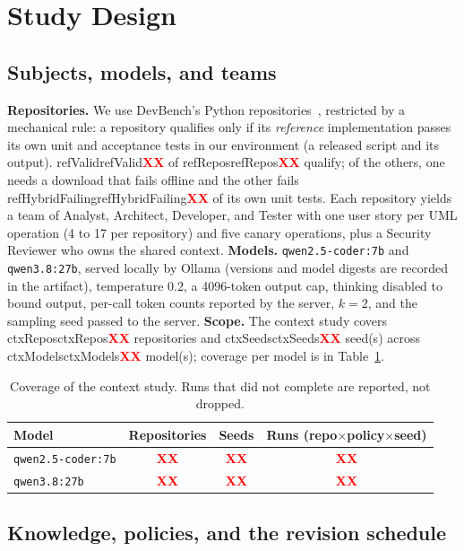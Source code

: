 \documentclass[10pt,conference]{IEEEtran}
\theoremstyle{definition}
\newcommand{\R}[1]{\ifcsname #1\endcsname\csname #1\endcsname\else\textcolor{red}{\textbf{XX}}\fi}
\newcommand{\XX}{\textcolor{red}{\textbf{XX}}}
\begin{document}
\section{Study Design}\label{sec:design}

\subsection{Subjects, models, and teams}

\textbf{Repositories.} We use DevBench's Python repositories~\cite{li2024devbench}, restricted by a
mechanical rule: a repository qualifies only if its \emph{reference} implementation passes its own
unit and acceptance tests in our environment (a released script and its output). \R{refValid} of
\R{refRepos} qualify; of the others, one needs a download that fails offline and the other fails
\R{refHybridFailing} of its own unit tests. Each repository yields a team of Analyst, Architect,
Developer, and Tester with one user story per UML operation (4 to 17 per repository) and five canary
operations, plus a Security Reviewer who owns the shared context.
\textbf{Models.} \texttt{qwen2.5-coder:7b} and \texttt{qwen3.8:27b}, served locally by Ollama
(versions and model digests are recorded in the artifact), temperature $0.2$, a 4096-token output cap,
thinking disabled to bound output, per-call token counts reported by the server, $k{=}2$, and the sampling
seed passed to the server. \textbf{Scope.} The context study covers \R{ctxRepos} repositories and
\R{ctxSeeds} seed(s) across \R{ctxModels} model(s); coverage per model is in Table~\ref{tab:scope}.

\begin{table}[t]
\centering
\caption{Coverage of the context study. Runs that did not complete are reported, not dropped.}
\label{tab:scope}
\footnotesize
\begin{tabular}{@{}lccc@{}}
\toprule
Model & Repositories & Seeds & Runs (repo$\times$policy$\times$seed) \\
\midrule
\texttt{qwen2.5-coder:7b} & \XX & \XX & \XX \\
\texttt{qwen3.8:27b}      & \XX & \XX & \XX \\
\bottomrule
\end{tabular}
\end{table}

\subsection{Knowledge, policies, and the revision schedule}
\end{document}
